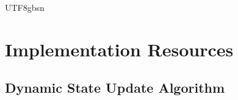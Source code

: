 \documentclass[11pt]{article}
\begin{document}
\begin{CJK*}{UTF8}{gbsn}
%
%
%
%



\appendix

\section{Implementation Resources}
\label{sec:impl_resources}

\subsection{Dynamic State Update Algorithm}
\label{sec:algorithm}


\end{CJK*}
\end{document}
